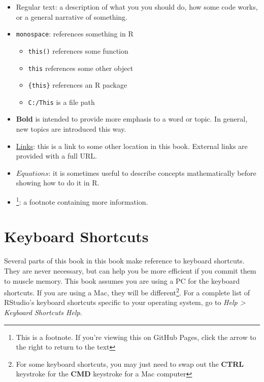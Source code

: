 \documentclass[]{book}
\providecommand{\tightlist}{%
  \setlength{\itemsep}{0pt}\setlength{\parskip}{0pt}}
\let\rmarkdownfootnote\footnote%
\def\footnote{\protect\rmarkdownfootnote}
\theoremstyle{definition}
\theoremstyle{definition}
\theoremstyle{definition}
\theoremstyle{remark}
\begin{document}
\begin{itemize}
\tightlist
\item
  Regular text: a description of what you you should do, how some code
  works, or a general narrative of something.
\item
  \texttt{monospace}: references something in R

  \begin{itemize}
  \tightlist
  \item
    \texttt{this()} references some function
  \item
    \texttt{this} references some other object
  \item
    \texttt{\{this\}} references an R package
  \item
    \texttt{C:/This} is a file path
  \end{itemize}
\item
  \textbf{Bold} is intended to provide more emphasis to a word or topic.
  In general, new topics are introduced this way.
\item
  \protect\hyperlink{notation}{Links}: this is a link to some other
  location in this book. External links are provided with a full URL.
\item
  \(Equations\): it is sometimes useful to describe concepts
  mathematically before showing how to do it in R.
\item
  \footnote{This is a footnote. If you're viewing this on GitHub Pages,
    click the arrow to the right to return to the text}: a footnote
  containing more information.
\end{itemize}

\section*{Keyboard Shortcuts}\label{keyboard-shortcuts}

Several parts of this book in this book make reference to keyboard
shortcuts. They are never necessary, but can help you be more efficient
if you commit them to muscle memory. This book assumes you are using a
PC for the keyboard shortcuts. If you are using a Mac, they will be
different\footnote{For some keyboard shortcuts, you may just need to
  swap out the \textbf{CTRL} keystroke for the \textbf{CMD} keystroke
  for a Mac computer}. For a complete list of RStudio's keyboard
shortcuts specific to your operating system, go to \emph{Help
\textgreater{} Keyboard Shortcuts Help}.
\end{document}
